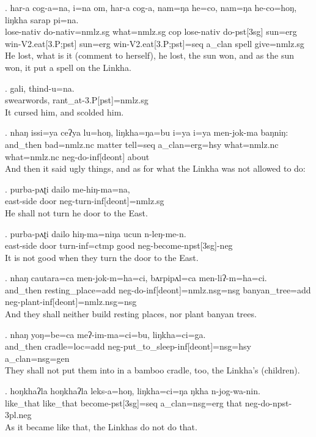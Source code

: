 \exg. har-a cog-a=na, i=na om, har-a cog-a, nam=ŋa he=co, nam=ŋa he-co=hoŋ, liŋkha sarap pi=na.\\
lose{\sc -nativ} do{\sc -nativ=nmlz.sg} what{\sc =nmlz.sg} cop lose{\sc -nativ} do{\sc -pst[3sg]} sun{\sc =erg} win{\sc -V2.eat[3.P;pst]} sun{\sc =erg} win{\sc -V2.eat[3.P;pst]=seq} a\_clan spell give{\sc [3.A;3.P]=nmlz.sg}\\
He lost, what is it (comment to herself), he lost, the sun won, and as the sun won, it put a spell on the Linkha.


\exg. gali, thind-u=na.\\
swearwords, rant\_at{\sc -3.P[pst]=nmlz.sg}\\
It cursed him, and scolded him.


\exg. nhaŋ issi=ya ceʔya lu=hoŋ, liŋkha=ŋa=bu i=ya i=ya men-jok-ma baŋniŋ:\\
and\_then bad{\sc =nmlz.nc} matter tell{\sc =seq} a\_clan{\sc =erg=hsy} what{\sc =nmlz.nc} what{\sc =nmlz.nc} {\sc neg-}do{\sc -inf[deont]} about\\
And then it said ugly things, and as for what the Linkha was not allowed to do:


\exg. purba-pʌʈi dailo me-hiŋ-ma=na,\\
east-side door {\sc neg-}turn{\sc -inf[deont]=nmlz.sg}\\
He shall not turn he door to the East.


\exg. purba-pʌʈi dailo hiŋ-ma=niŋa ucun n-leŋ-me-n.\\
east-side door turn{\sc -inf=ctmp} good {\sc neg-}become{\sc -npst[3sg]-neg}\\
It is not good when they turn the door to the East.


\exg. nhaŋ cautara=ca men-jok-m=ha=ci, bʌrpipʌl=ca men-liʔ-m=ha=ci.\\
and\_then resting\_place{\sc =add} {\sc neg-}do{\sc -inf[deont]=nmlz.nsg=nsg} banyan\_tree{\sc =add} {\sc neg-}plant{\sc -inf[deont]=nmlz.nsg=nsg}\\
And they shall neither build resting places, nor plant banyan trees.


\exg. nhaŋ yoŋ=be=ca meʔ-im-ma=ci=bu, liŋkha=ci=ga.\\
and\_then cradle{\sc =loc=add} {\sc neg-}put\_to\_sleep{\sc -inf[deont]=nsg=hsy} a\_clan{\sc =nsg=gen}\\
They shall not put them into in a bamboo cradle, too, the Linkha's (children).


\exg. hoŋkhaʔla hoŋkhaʔla leks-a=hoŋ, liŋkha=ci=ŋa ŋkha n-jog-wa-nin.\\
like\_that like\_that become{\sc -pst[3sg]=seq} a\_clan{\sc =nsg=erg} that {\sc neg-}do{\sc -npst-3pl.neg}\\
As it became like that, the Linkhas do not do that.



